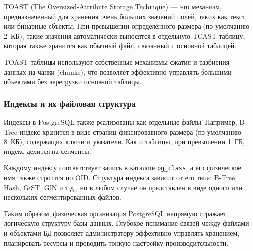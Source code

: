 TOAST (The Oversized-Attribute Storage Technique) --- это механизм, предназначенный для хранения очень больших значений полей, таких как текст или бинарные объекты. При превышении определённого размера (по умолчанию 2~КБ), такие значения автоматически выносятся в отдельную TOAST-таблицу, которая также хранится как обычный файл, связанный с основной таблицей.

TOAST-таблицы используют собственные механизмы сжатия и разбиения данных на чанки (chunks), что позволяет эффективно управлять большими объектами без перегрузки основной таблицы.

\subsubsection{Индексы и их файловая структура}

Индексы в PostgreSQL также реализованы как отдельные файлы. Например, B-Tree индекс хранится в виде страниц фиксированного размера (по умолчанию 8~КБ), содержащих ключи и указатели. Как и таблицы, при превышении 1~ГБ, индекс делится на сегменты.

Каждому индексу соответствует запись в каталоге \texttt{pg\_class}, а его физическое имя также строится по OID. Структура индекса зависит от его типа: B-Tree, Hash, GiST, GIN и т.д., но в любом случае он представлен в виде одного или нескольких сегментированных файлов.

\bigskip

Таким образом, физическая организация PostgreSQL напрямую отражает логическую структуру базы данных. Глубокое понимание связей между файлами и объектами БД позволяет администратору эффективно управлять хранением, планировать ресурсы и проводить тонкую настройку производительности.

